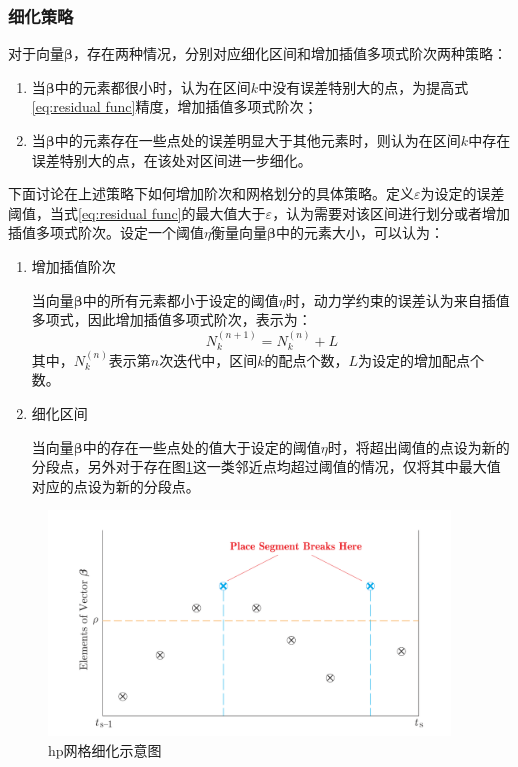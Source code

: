 \subsubsection{细化策略}
对于向量$ \bm{\beta} $，存在两种情况，分别对应细化区间和增加插值多项式阶次两种策略：
\begin{enumerate}
	\item 当$ \bm{\beta} $中的元素都很小时，认为在区间$ k $中没有误差特别大的点，为提高式\eqref{eq:residual func}精度，增加插值多项式阶次；
	\item 当$ \bm{\beta} $中的元素存在一些点处的误差明显大于其他元素时，则认为在区间$ k $中存在误差特别大的点，在该处对区间进一步细化。
\end{enumerate}

下面讨论在上述策略下如何增加阶次和网格划分的具体策略。定义$ \varepsilon $为设定的误差阈值，当式\eqref{eq:residual func}的最大值大于$ \varepsilon $，认为需要对该区间进行划分或者增加插值多项式阶次。设定一个阈值$ \eta$衡量向量$ \bm{\beta} $中的元素大小，可以认为：
\begin{enumerate}
	\item 增加插值阶次\par
	当向量$ \bm{\beta} $中的所有元素都小于设定的阈值$ \eta $时，动力学约束的误差认为来自插值多项式，因此增加插值多项式阶次，表示为：
	\begin{equation}
		N^{(n+1)}_k=N^{(n)}_k+L
	\end{equation}
	其中，$ N^{(n)}_k $表示第$ n $次迭代中，区间$ k $的配点个数，$ L $为设定的增加配点个数。
	\item 细化区间\par
	当向量$ \bm{\beta} $中的存在一些点处的值大于设定的阈值$ \eta $时，将超出阈值的点设为新的分段点，另外对于存在图\ref{fig:hp-sketch}这一类邻近点均超过阈值的情况，仅将其中最大值对应的点设为新的分段点。
\end{enumerate}
\begin{figure}[htb]
	\begin{small}
		\begin{center}
			\includegraphics[width=0.95\textwidth]{figures/hp-sketch}
		\end{center}
		\caption{hp网格细化示意图}
		\label{fig:hp-sketch}
	\end{small}
\end{figure}



